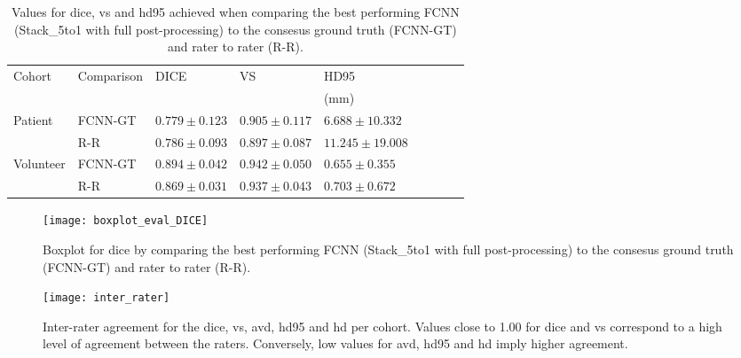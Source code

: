 \begin{table}[htbp]
   \centering
   \caption[Results for Evaluation]{Values for \acrlong{dice}, \acrlong{vs} and \acrlong{hd95} achieved when comparing the best performing FCNN (Stack\_5to1 with full post-processing) to the consesus ground truth (FCNN-GT) and rater to rater (R-R).}
   \begin{tabular}{l*{8}{l}}
      \toprule
      Cohort	& Comparison & DICE              & VS				& HD95\\
      			&			&					&					& (mm)\\
      \midrule
        Patient     & FCNN-GT & $0.779 \pm 0.123$ & $\mathbf{0.905 \pm 0.117}$ &                     $\mathbf{6.688  \pm 10.332}$ \\
                    & R-R     & $\mathbf{0.786 \pm 0.093}$ & $0.897 \pm 0.087$ &                     $11.245 \pm 19.008$ \\
        \midrule
        Volunteer   & FCNN-GT & $\mathbf{0.894 \pm 0.042}$ & $\mathbf{0.942 \pm 0.050}$ &                     $\mathbf{0.655  \pm 0.355} $ \\
                    & R-R     & $0.869 \pm 0.031$ & $0.937 \pm 0.043$ &                     $0.703  \pm 0.672 $ \\
      \bottomrule
   \end{tabular}
   \label{tab:res_fcnn_rater_small}
\end{table}

\begin{figure}[htbp]
	\centering
	\texttt{[image: boxplot\_eval\_DICE]}
    \caption[Boxplot for the \acrlong{dice} for the Evaluation]{Boxplot for \acrlong{dice} by comparing the best performing FCNN (Stack\_5to1 with full post-processing) to the consesus ground truth (FCNN-GT) and rater to rater (R-R).}
    \label{fig:results_eval_boxplot_dice}
\end{figure}

\begin{figure}[htbp]	
	\texttt{[image: inter\_rater]}
    \caption[Heatmap for Inter-Rater Agreement]{Inter-rater agreement for the \acrlong{dice}, \acrlong{vs}, \acrlong{avd}, \acrlong{hd95} and \acrlong{hd} per cohort. Values close to 1.00 for \gls{dice} and \gls{vs} correspond to a high level of agreement between the raters. Conversely, low values for \gls{avd}, \gls{hd95} and \gls{hd} imply higher agreement.}
    \label{fig:res_inter_rater}
\end{figure}


